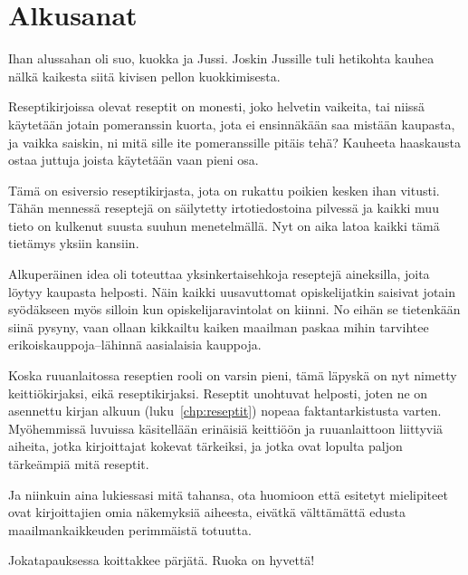 \documentclass[../keittiokirja.tex]{subfiles}
\begin{document}
\chapter{Alkusanat}
\label{chp:alkusanat}

Ihan alussahan oli suo, kuokka ja Jussi. Joskin Jussille tuli hetikohta kauhea nälkä 
kaikesta siitä kivisen pellon kuokkimisesta. 

Reseptikirjoissa olevat reseptit on monesti, 
joko helvetin vaikeita, tai niissä käytetään jotain pomeranssin kuorta, jota ei ensinnäkään 
saa mistään kaupasta, ja vaikka saiskin, ni mitä sille ite pomeranssille pitäis tehä? 
Kauheeta haaskausta ostaa juttuja joista käytetään vaan pieni osa.

Tämä on esiversio reseptikirjasta, jota on rukattu poikien kesken ihan vitusti. 
Tähän mennessä reseptejä on säilytetty irtotiedostoina pilvessä ja kaikki muu tieto on kulkenut 
suusta suuhun menetelmällä. Nyt on aika latoa kaikki tämä tietämys yksiin kansiin. 
	
Alkuperäinen idea oli toteuttaa yksinkertaisehkoja 
reseptejä aineksilla, joita löytyy kaupasta helposti. Näin kaikki uusavuttomat opiskelijatkin saisivat 
jotain syödäkseen myös silloin kun opiskelijaravintolat on kiinni. No eihän se tietenkään siinä pysyny, vaan 
ollaan kikkailtu kaiken maailman paskaa mihin tarvihtee erikoiskauppoja--lähinnä aasialaisia 
kauppoja.
    
Koska ruuanlaitossa reseptien rooli on varsin pieni, tämä läpyskä on nyt nimetty keittiökirjaksi, eikä 
reseptikirjaksi. Reseptit unohtuvat helposti, joten ne on asennettu kirjan alkuun (luku~\ref{chp:reseptit}) 
nopeaa faktantarkistusta varten. Myöhemmissä luvuissa käsitellään erinäisiä keittiöön ja ruuanlaittoon 
liittyviä aiheita, jotka kirjoittajat kokevat tärkeiksi, ja jotka ovat lopulta paljon tärkeämpiä mitä 
reseptit. 

Ja niinkuin aina lukiessasi mitä tahansa, ota huomioon että esitetyt mielipiteet ovat kirjoittajien 
omia näkemyksiä aiheesta, eivätkä välttämättä edusta maailmankaikkeuden perimmäistä totuutta.
    
Jokatapauksessa koittakkee pärjätä. Ruoka on hyvettä!
\end{document}
